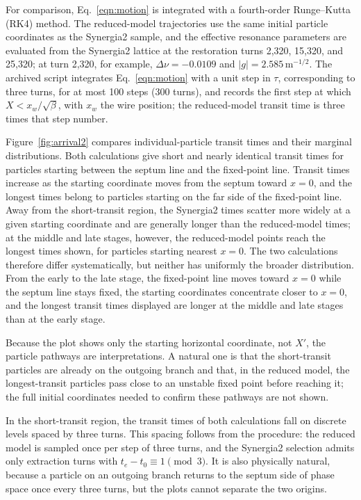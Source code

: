 \documentclass[a4paper,fleqn]{cas-sc}
\begin{document}
For comparison, Eq.~\eqref{eqn:motion} is integrated with a fourth-order Runge--Kutta (RK4) method. The reduced-model trajectories use the same initial particle coordinates as the Synergia2 sample, and the effective resonance parameters are evaluated from the Synergia2 lattice at the restoration turns 2,320, 15,320, and 25,320; at turn 2,320, for example, $\Delta\nu=-0.0109$ and $|g|=2.585\,\mathrm{m^{-1/2}}$. The archived script integrates Eq.~\eqref{eqn:motion} with a unit step in $\tau$, corresponding to three turns, for at most 100 steps (300 turns), and records the first step at which $X<x_w/\sqrt{\beta}$, with $x_w$ the wire position; the reduced-model transit time is three times that step number.

Figure~\ref{fig:arrival2} compares individual-particle transit times and their marginal distributions. Both calculations give short and nearly identical transit times for particles starting between the septum line and the fixed-point line. Transit times increase as the starting coordinate moves from the septum toward $x=0$, and the longest times belong to particles starting on the far side of the fixed-point line. Away from the short-transit region, the Synergia2 times scatter more widely at a given starting coordinate and are generally longer than the reduced-model times; at the middle and late stages, however, the reduced-model points reach the longest times shown, for particles starting nearest $x=0$. The two calculations therefore differ systematically, but neither has uniformly the broader distribution. From the early to the late stage, the fixed-point line moves toward $x=0$ while the septum line stays fixed, the starting coordinates concentrate closer to $x=0$, and the longest transit times displayed are longer at the middle and late stages than at the early stage.

Because the plot shows only the starting horizontal coordinate, not $X'$, the particle pathways are interpretations. A natural one is that the short-transit particles are already on the outgoing branch and that, in the reduced model, the longest-transit particles pass close to an unstable fixed point before reaching it; the full initial coordinates needed to confirm these pathways are not shown.

In the short-transit region, the transit times of both calculations fall on discrete levels spaced by three turns. This spacing follows from the procedure: the reduced model is sampled once per step of three turns, and the Synergia2 selection admits only extraction turns with $t_e-t_0\equiv1\pmod 3$. It is also physically natural, because a particle on an outgoing branch returns to the septum side of phase space once every three turns, but the plots cannot separate the two origins.
\end{document}
